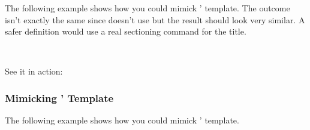 \documentclass{xsim-manual}
\begin{document}
The following example shows how you could mimick ' 
template.  The outcome isn't exactly the same since  doesn't use
 but the result should look very similar.  A safer definition
would use a real sectioning command for the title.

\begin{sourcecode}
  \usepackage{needspace}
    {%
      \par\vspace{\baselineskip}
      \noindent
      \textbf{\XSIMmixedcase{\GetExerciseName}~}%
    }
    {}
\end{sourcecode}

See it in action:
\begin{example}
  \renewcommand*\theexercise{\arabic{exercise}.}
  \begin{exercise}[subtitle=exsheets' runin,points=2.5]
    \lipsum[4]
  \end{exercise}
\end{example}

\subsubsection{Mimicking '  Template}

The following example shows how you could mimick '
 template.

\begin{sourcecode}
  \usepackage{needspace}
    {%
      \par\vspace{\baselineskip}
      \noindent
    }
    {}
\end{sourcecode}
\end{document}
